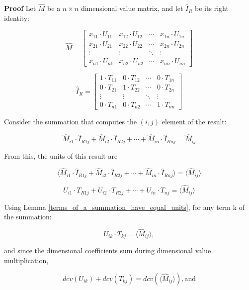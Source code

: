 \documentclass[10pt,letterpaper]{article}
\newenvironment{proof}{\noindent\textbf{Proof} }{\qed \newline}
\newcommand{\qed}{\nobreak \ifvmode \relax \else
      \ifdim\lastskip<1.5em \hskip-\lastskip
      \hskip1.5em plus0em minus0.5em \fi \nobreak
      \vrule height0.75em width0.5em depth0.25em\fi}
\numberwithin{equation}{section}
\begin{document}
\begin{proof}Let $\hat M$ be a $n \times n$ dimensional value matrix,
  and let $\hat I_R$ be its right identity:

\[ \hat M = \left[ \begin{matrix} 
  x_{11} \cdot U_{11} & x_{12} \cdot U_{12} & \cdots & x_{1n} \cdot U_{1n} \\
  x_{21} \cdot U_{21} & x_{22} \cdot U_{22} & \cdots & x_{2n} \cdot U_{2n} \\
  \vdots & \vdots & \ddots & \vdots \\
  x_{n1} \cdot U_{n1} & x_{n2} \cdot U_{n2} & \cdots & x_{nn} \cdot U_{nn}
 \end{matrix} \right] \]

\[ \hat I_R = \left[ \begin{matrix} 
  1 \cdot T_{11} & 0 \cdot T_{12} & \cdots & 0 \cdot T_{1n} \\
  0 \cdot T_{21} & 1 \cdot T_{22} & \cdots & 0 \cdot T_{2n} \\
  \vdots & \vdots & \ddots & \vdots \\
  0 \cdot T_{n1} & 0 \cdot T_{n2} & \cdots & 1 \cdot T_{nn}
 \end{matrix} \right] \]

Consider the summation that computes the $(i, j)$ element of the
result:

\[ \hat M_{i1} \cdot \hat I_{R1j} + \hat M_{i2} \cdot \hat I_{R2j} +\cdots + \hat M_{in} \cdot \hat I_{Rnj} = \hat M_{ij} \]

From this, the units of this result are

\[ \langle \hat M_{i1} \cdot \hat I_{R1j} + \hat M_{i2} \cdot \hat I_{R2j} +\cdots + \hat M_{in} \cdot \hat I_{Rnj} \rangle = \langle \hat M_{ij} \rangle \]

\[ U_{i1} \cdot T_{R1j} + U_{i2} \cdot T_{R2j} +\cdots + U_{in} \cdot T_{nj} = \langle \hat M_{ij} \rangle \]

Using Lemma \ref{terms_of_a_summation_have_equal_units}, for any term
k of the summation:

\[ U_{ik} \cdot T_{kj} = \langle \hat M_{ij} \rangle , \]

and since the dimensional coefficients sum during dimensional value
multiplication,

\begin{equation} \label{basic_equation_1_for_right_identity_ddv_proof} 
dcv(U_{ik}) + dcv(T_{kj}) = dcv( \langle \hat M_{ij} \rangle ) , \mbox{and} \end{equation}


\end{proof}
\end{document}
